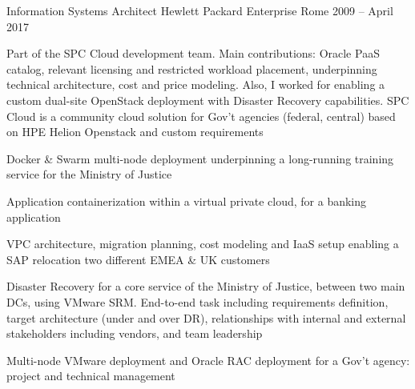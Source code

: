 \begin{cventries}

  \cventry
    {Information Systems Architect} %
    {Hewlett Packard Enterprise} %
    {Rome} %
    {2009 -- April 2017} %
    {
      \begin{cvitems} %
        \item {Part of the SPC Cloud development team. Main contributions: Oracle PaaS catalog, relevant licensing and restricted workload placement, underpinning technical architecture, cost and price modeling. Also, I worked for enabling a custom dual-site OpenStack deployment with Disaster Recovery capabilities. SPC Cloud is a community cloud solution for Gov't agencies (federal, central) based on HPE Helion Openstack and custom requirements}
        \item {Docker \& Swarm multi-node deployment underpinning a long-running training service for the Ministry of Justice}
        \item {Application containerization within a virtual private cloud, for a banking application}
        \item {VPC architecture, migration planning, cost modeling and IaaS setup enabling a SAP relocation two different EMEA \& UK customers}
        \item {Disaster Recovery for a core service of the Ministry of Justice, between two main DCs, using VMware SRM. End-to-end task including requirements definition, target architecture (under and over DR), relationships with internal and external stakeholders including vendors, and team leadership}
        \item {Multi-node VMware deployment and Oracle RAC deployment for a Gov't agency: project and technical management}
      \end{cvitems}
    }



\end{cventries}
